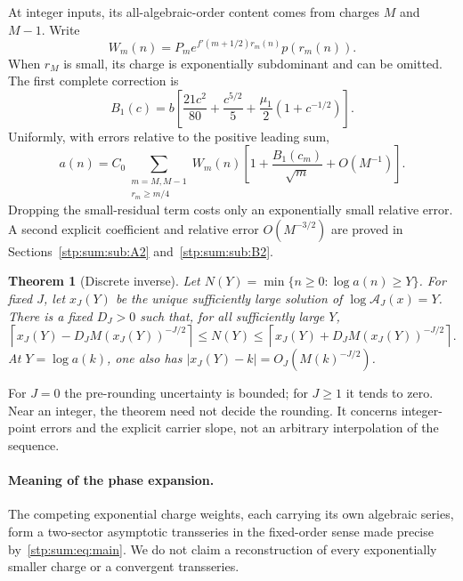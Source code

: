 \documentclass[11pt]{article}
\newtheorem{theorem}{Theorem}[section]
\theoremstyle{remark}\newtheorem{remark}[theorem]{Remark}
\newcommand{\cA}{\mathcal A}
\begin{document}
At integer inputs, its all-algebraic-order content comes from charges $M$ and $M-1$. Write
\begin{equation}\label{stp:sum:eq:W}
 W_m(n)=P_m e^{f'(m+1/2)r_m(n)}p(r_m(n)).
\end{equation}
When $r_M$ is small, its charge is exponentially subdominant and can be omitted. The first complete correction is
\begin{equation}\label{stp:sum:eq:B1}
 B_1(c)=b\left[\frac{21c^2}{80}+\frac{c^{5/2}}5
                 +\frac{\mu_1}{2}(1+c^{-1/2})\right].
\end{equation}
Uniformly, with errors relative to the positive leading sum,
\begin{equation}\label{stp:sum:eq:firstfull}
 a(n)=C_0\!\sum_{\substack{m=M,M-1\\r_m\ge m/4}}
 W_m(n)\left[1+\frac{B_1(c_m)}{\sqrt m}+O(M^{-1})\right].
\end{equation}
Dropping the small-residual term costs only an exponentially small relative error. A second explicit coefficient and relative error $O(M^{-3/2})$ are proved in Sections~\ref{stp:sum:sub:A2} and~\ref{stp:sum:sub:B2}.

\begin{theorem}[Discrete inverse]\label{stp:sum:thm:inverse}
Let $N(Y)=\min\{n\ge0:\log a(n)\ge Y\}$. For fixed $J$, let $x_J(Y)$ be the unique sufficiently large solution of $\log\cA_J(x)=Y$. There is a fixed $D_J>0$ such that, for all sufficiently large $Y$,
\begin{equation}\label{stp:sum:eq:inverse}
 \left\lceil x_J(Y)-D_J M(x_J(Y))^{-J/2}\right\rceil
 \le N(Y)\le
 \left\lceil x_J(Y)+D_J M(x_J(Y))^{-J/2}\right\rceil.
\end{equation}
At $Y=\log a(k)$, one also has $|x_J(Y)-k|=O_J(M(k)^{-J/2})$.
\end{theorem}
For $J=0$ the pre-rounding uncertainty is bounded; for $J\ge1$ it tends to zero. Near an integer, the theorem need not decide the rounding. It concerns integer-point errors and the explicit carrier slope, not an arbitrary interpolation of the sequence.

\paragraph{Meaning of the phase expansion.}
The competing exponential charge weights, each carrying its own algebraic series, form a two-sector asymptotic transseries in the fixed-order sense made precise by~\eqref{stp:sum:eq:main}. We do not claim a reconstruction of every exponentially smaller charge or a convergent transseries.
\end{document}
